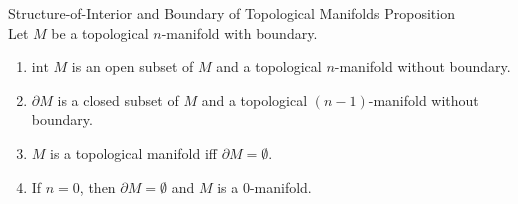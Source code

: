 \begin{proposition}{Structure-of-Interior and Boundary of Topological Manifolds Proposition}\\
Let $M$ be a topological $n$-manifold with boundary.
\begin{enumerate}
    \item $\text{int }M$ is an open subset of $M$ and a topological $n$-manifold without boundary.
    \item $\partial M$ is a closed subset of $M$ and a topological $(n-1)$-manifold without boundary.
    \item $M$ is a topological manifold iff $\partial M=\emptyset$.
    \item If $n=0$, then $\partial M=\emptyset$ and $M$ is a $0$-manifold.
\end{enumerate}
\end{proposition}

